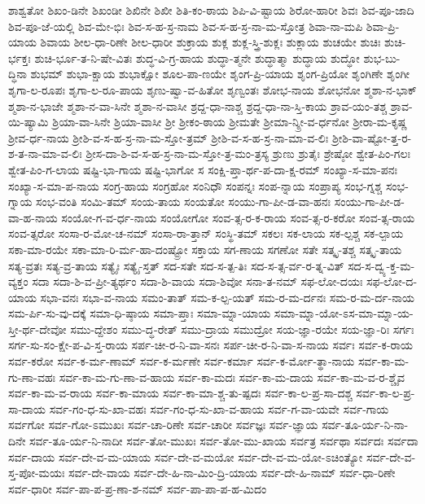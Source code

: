 {ಶಾಶ್ವತೋ
ಶಿಖಂ-ಡಿನೇ
ಶಿಖಂಡೀ
ಶಿಖಿನೇ
ಶಿಖೀ
ಶಿತಿ-ಕಂ-ಠಾಯ
ಶಿಪಿ-ವಿ-ಷ್ಟಾಯ
ಶಿರೋ-ಹಾರೀ
ಶಿವಃ
ಶಿವ-ಪೂ-ಜಾದಿ
ಶಿವ-ಪೂ-ಜೆ-ಯಲ್ಲಿ
ಶಿವ-ಮೇ-ಭಿಃ
ಶಿವ-ಸ-ಹ-ಸ್ರ-ನಾಮ
ಶಿವ-ಸ-ಹ-ಸ್ರ-ನಾ-ಮ-ಸ್ತೋತ್ರ
ಶಿವಾ-ನಾ-ಮಪಿ
ಶಿವಾ-ಪ್ರಿ-ಯಾಯ
ಶಿವಾಯ
ಶೀಲ-ಧಾ-ರಿಣೇ
ಶೀಲ-ಧಾರೀ
ಶುಕ್ರಾಯ
ಶುಕ್ಲ
ಶುಕ್ಲ-ಸ್ತ್ರಿ-ಶುಕ್ಲಃ
ಶುಕ್ಲಾಯ
ಶುಚಯೇ
ಶುಚಿಃ
ಶುಚಿ-ರ್ಭಕ್ತಃ
ಶುಚಿ-ರ್ಭೂ-ತ-ನಿ-ಷೇ-ವಿತಃ
ಶುದ್ಧ-ವಿ-ಗ್ರ-ಹಾಯ
ಶುದ್ಧಾ-ತ್ಮನೇ
ಶುದ್ಧಾತ್ಮಾ
ಶುದ್ಧಾಯ
ಶುದ್ಧೋ
ಶುಭ-ಬು-ದ್ಧಿನಾ
ಶುಭಮ್
ಶುಭಾ-ಕ್ಷಾಯ
ಶುಭಾಕ್ಷೋ
ಶೂಲ-ಪಾ-ಣಯೇ
ಶೃಂಗ-ಪ್ರಿ-ಯಾಯ
ಶೃಂಗ-ಪ್ರಿಯೋ
ಶೃಂಗಿಣೇ
ಶೃಂಗೀ
ಶೃಗಾ-ಲ-ರೂಪಃ
ಶೃಗಾ-ಲ-ರೂ-ಪಾಯ
ಶೃಣು-ಷ್ವಾ-ವ-ಹಿತೋ
ಶೃಣ್ವಂತಃ
ಶೋಭ-ನಾಯ
ಶೋಭನೋ
ಶ್ಮಶಾ-ನ-ಭಾಕ್
ಶ್ಮಶಾ-ನ-ಭಾಜೇ
ಶ್ಮಶಾ-ನ-ವಾ-ಸಿನೇ
ಶ್ಮಶಾ-ನ-ವಾಸೀ
ಶ್ರದ್ದ-ಧಾ-ನಾಶ್ಚ
ಶ್ರದ್ದ-ಧಾ-ನಾ-ಸ್ತಿ-ಕಾಯ
ಶ್ರಾವ-ಯಂ-ತಶ್ಚ
ಶ್ರಾವ-ಯಿ-ಷ್ಯಾಮಿ
ಶ್ರಿಯಾ-ವಾ-ಸಿನೇ
ಶ್ರಿಯಾ-ವಾಸೀ
ಶ್ರೀ
ಶ್ರೀಕಂ-ಠಾಯ
ಶ್ರೀಮತೇ
ಶ್ರೀಮಾ-ನ್ಶ್ರೀ-ವ-ರ್ಧನೋ
ಶ್ರೀರಾ-ಮ-ಕೃಷ್ಣ
ಶ್ರೀವ-ರ್ಧ-ನಾಯ
ಶ್ರೀಶಿ-ವ-ಸ-ಹ-ಸ್ರ-ನಾ-ಮ-ಸ್ತೋ-ತ್ರಮ್
ಶ್ರೀಶಿ-ವ-ಸ-ಹ-ಸ್ರ-ನಾ-ಮಾ-ವ-ಲಿಃ
ಶ್ರೀಶಿ-ವಾ-ಷ್ಟೋ-ತ್ತ-ರ-ಶ-ತ-ನಾ-ಮಾ-ವ-ಲಿಃ
ಶ್ರೀಸ-ದಾ-ಶಿ-ವ-ಸ-ಹ-ಸ್ರ-ನಾ-ಮ-ಸ್ತೋ-ತ್ರ-ಮಂ-ತ್ರಸ್ಯ
ಶ್ರುಣು
ಶ್ರುತೈಃ
ಶ್ರೇಷ್ಠೋ
ಶ್ವೇತ-ಪಿಂ-ಗಲಃ
ಶ್ವೇತ-ಪಿಂ-ಗ-ಲಾಯ
ಷಷ್ಟಿ-ಭಾ-ಗಾಯ
ಷಷ್ಟಿ-ಭಾಗೋ
ಸ
ಸಂಕ್ಷಿ-ಪ್ತಾ-ರ್ಥ-ಪ-ದಾ-ಕ್ಷ-ರಮ್
ಸಂಖ್ಯಾ-ಸ-ಮಾ-ಪನಃ
ಸಂಖ್ಯಾ-ಸ-ಮಾ-ಪ-ನಾಯ
ಸಂಗ್ರ-ಹಾಯ
ಸಂಗ್ರಹೋ
ಸಂನಿಧೌ
ಸಂಪನ್ನಃ
ಸಂಪ-ನ್ನಾಯ
ಸಂಪ್ರಾಪ್ಯ
ಸಂಭ-ಗ್ನಶ್ಚ
ಸಂಭ-ಗ್ನಾಯ
ಸಂಭ-ವಂತಿ
ಸಂಮಿ-ತಮ್
ಸಂಯ-ತಾಯ
ಸಂಯತೋ
ಸಂಯು-ಗಾ-ಪೀ-ಡ-ವಾ-ಹನಃ
ಸಂಯು-ಗಾ-ಪೀ-ಡ-ವಾ-ಹ-ನಾಯ
ಸಂಯೋ-ಗ-ವ-ರ್ಧ-ನಾಯ
ಸಂಯೋಗೋ
ಸಂವ-ತ್ಸ-ರ-ಕ-ರಾಯ
ಸಂವ-ತ್ಸ-ರ-ಕರೋ
ಸಂವ-ತ್ಸ-ರಾಯ
ಸಂವ-ತ್ಸರೋ
ಸಂಸಾ-ರ-ಮೋ-ಚ-ನಮ್
ಸಂಸಾ-ರಾ-ತ್ತಾನ್
ಸಂಸ್ಥಿ-ತಮ್
ಸಕಲಃ
ಸಕ-ಲಾಯ
ಸಕ-ಲ್ಪಶ್ಚ
ಸಕ-ಲ್ಪಾಯ
ಸಕಾ-ಮಾ-ರಯೇ
ಸಕಾ-ಮಾ-ರಿ-ರ್ಮ-ಹಾ-ದಂಷ್ಟ್ರೋ
ಸಕ್ತಾಯ
ಸಗ-ಣಾಯ
ಸಗಣೋ
ಸತೇ
ಸತ್ಕೃ-ತಶ್ಚ
ಸತ್ಕೃ-ತಾಯ
ಸತ್ಯ-ವ್ರತಃ
ಸತ್ಯ-ವ್ರ-ತಾಯ
ಸತ್ಯೈಃ
ಸತ್ಯೈ-ಸ್ತತ್
ಸದ-ಸತೇ
ಸದ-ಸ-ತ್ಪ-ತಿಃ
ಸದ-ಸ-ತ್ಸ-ರ್ವ-ರ-ತ್ನ-ವಿತ್
ಸದ-ಸ-ದ್ವ್ಯ-ಕ್ತ-ಮ-ವ್ಯಕ್ತಂ
ಸದಾ
ಸದಾ-ಶಿ-ವ-ಪ್ರೀ-ತ್ಯರ್ಥಂ
ಸದಾ-ಶಿ-ವಾಯ
ಸದಾ-ಶಿವೋ
ಸನಾ-ತ-ನಮ್
ಸಫ-ಲೋ-ದಯಃ
ಸಫ-ಲೋ-ದ-ಯಾಯ
ಸಭಾ-ವನಃ
ಸಭಾ-ವ-ನಾಯ
ಸಮಂ-ತಾತ್
ಸಮ-ಕ-ಲ್ಪ-ಯತ್
ಸಮ-ರ-ಮ-ರ್ದನಃ
ಸಮ-ರ-ಮ-ರ್ದ-ನಾಯ
ಸಮ-ರ್ಪಿ-ಸು-ವು-ದಕ್ಕೆ
ಸಮಾ-ಧಿ-ಷ್ಠಾಯ
ಸಮಾ-ಪ್ತಾಃ
ಸಮಾ-ಮ್ನಾ-ಯಾಯ
ಸಮಾ-ಮ್ನಾ-ಯೋ-ಽಸ-ಮಾ-ಮ್ನಾ-ಯ-ಸ್ತೀ-ರ್ಥ-ದೇವೋ
ಸಮು-ದ್ದೇಶಂ
ಸಮು-ದ್ಧ-ರೇತ್
ಸಮು-ದ್ರಾಯ
ಸಮುದ್ರೋ
ಸಯ-ಜ್ಞಾ-ರಯೇ
ಸಯ-ಜ್ಞಾ-ರಿಃ
ಸರ್ಗಃ
ಸರ್ಗ-ಸು-ಸಂ-ಕ್ಷೇ-ಪ-ವಿ-ಸ್ತ-ರಾಯ
ಸರ್ಪ-ಚೀ-ರ-ನಿ-ವಾ-ಸನಃ
ಸರ್ಪ-ಚೀ-ರ-ನಿ-ವಾ-ಸ-ನಾಯ
ಸರ್ವಃ
ಸರ್ವ-ಕ-ರಾಯ
ಸರ್ವ-ಕರೋ
ಸರ್ವ-ಕ-ರ್ಮ-ಣಾಮ್
ಸರ್ವ-ಕ-ರ್ಮಣೇ
ಸರ್ವ-ಕರ್ಮಾ
ಸರ್ವ-ಕ-ರ್ಮೋ-ತ್ಥಾ-ನಾಯ
ಸರ್ವ-ಕಾ-ಮ-ಗು-ಣಾ-ವಹಃ
ಸರ್ವ-ಕಾ-ಮ-ಗು-ಣಾ-ವ-ಹಾಯ
ಸರ್ವ-ಕಾ-ಮದಃ
ಸರ್ವ-ಕಾ-ಮ-ದಾಯ
ಸರ್ವ-ಕಾ-ಮ-ವ-ರ-ಶ್ಚೈವ
ಸರ್ವ-ಕಾ-ಮ-ವ-ರಾಯ
ಸರ್ವ-ಕಾ-ಮಾಯ
ಸರ್ವ-ಕಾ-ಮಾ-ಶ್ಚ-ತು-ಷ್ಪದಃ
ಸರ್ವ-ಕಾ-ಲ-ಪ್ರ-ಸಾ-ದಶ್ಚ
ಸರ್ವ-ಕಾ-ಲ-ಪ್ರ-ಸಾ-ದಾಯ
ಸರ್ವ-ಗಂ-ಧ-ಸು-ಖಾ-ವಹಃ
ಸರ್ವ-ಗಂ-ಧ-ಸು-ಖಾ-ವ-ಹಾಯ
ಸರ್ವ-ಗ-ವಾ-ಯವೇ
ಸರ್ವ-ಗಾಯ
ಸರ್ವಗೋ
ಸರ್ವ-ಗೋ-ಽಮುಖಃ
ಸರ್ವ-ಚಾ-ರಿಣೇ
ಸರ್ವ-ಚಾರೀ
ಸರ್ವಜ್ಞಃ
ಸರ್ವ-ಜ್ಞಾಯ
ಸರ್ವ-ತೂ-ರ್ಯ-ನಿ-ನಾ-ದಿನೇ
ಸರ್ವ-ತೂ-ರ್ಯ-ನಿ-ನಾದೀ
ಸರ್ವ-ತೋ-ಮುಖಃ
ಸರ್ವ-ತೋ-ಮು-ಖಾಯ
ಸರ್ವತ್ರ
ಸರ್ವಥಾ
ಸರ್ವದಃ
ಸರ್ವದಾ
ಸರ್ವ-ದಾಯ
ಸರ್ವ-ದೇ-ವ-ಮ-ಯಾಯ
ಸರ್ವ-ದೇ-ವ-ಮಯೋ
ಸರ್ವ-ದೇ-ವ-ಮ-ಯೋ-ಽಚಿಂತ್ಯೋ
ಸರ್ವ-ದೇ-ವ-ಸ್ತ-ಪೋ-ಮಯಃ
ಸರ್ವ-ದೇ-ವಾಯ
ಸರ್ವ-ದೇ-ಹಿ-ನಾ-ಮಿಂ-ದ್ರಿ-ಯಾಯ
ಸರ್ವ-ದೇ-ಹಿ-ನಾಮ್
ಸರ್ವ-ಧಾ-ರಿಣೇ
ಸರ್ವ-ಧಾರೀ
ಸರ್ವ-ಪಾ-ಪ-ಪ್ರ-ಣಾ-ಶ-ನಮ್
ಸರ್ವ-ಪಾ-ಪಾ-ಪ-ಹ-ಮಿದಂ
}
